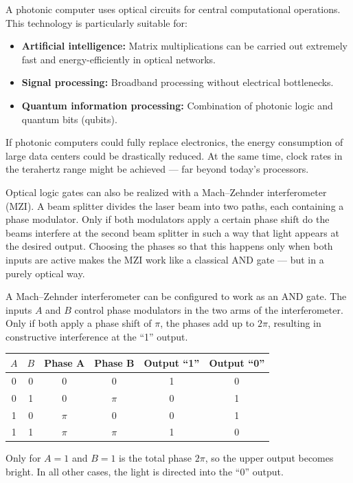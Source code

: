 A photonic computer uses optical circuits for central computational operations. This technology is particularly suitable for:
\begin{itemize}
	\item \textbf{Artificial intelligence:} Matrix multiplications can be carried out extremely fast and energy-efficiently in optical networks.
	\item \textbf{Signal processing:} Broadband processing without electrical bottlenecks.
	\item \textbf{Quantum information processing:} Combination of photonic logic and quantum bits (qubits).
\end{itemize}
\vspace{1em}
\begin{tcolorbox}[hypobox, title={What If Optical Computers Replaced Electronics?}]
	\label{box:optlogik_zukunft}
	\small
	If photonic computers could fully replace electronics, the energy consumption of large data centers could be drastically reduced. At the same time, clock rates in the terahertz range might be achieved — far beyond today’s processors.
\end{tcolorbox}
\vspace{1em}
Optical logic gates can also be realized with a Mach–Zehnder interferometer (MZI). 
A beam splitter divides the laser beam into two paths, each containing a phase modulator. 
Only if both modulators apply a certain phase shift do the beams interfere at the second beam splitter in such a way that light appears at the desired output. 
Choosing the phases so that this happens only when both inputs are active makes the MZI work like a classical \textsc{AND} gate — but in a purely optical way. 
\vspace{1em}
\begin{tcolorbox}[didaktikbox, title=Photonic AND Gate in a Mach--Zehnder Interferometer, label={box:mzi_and}]
	\small
	A Mach--Zehnder interferometer can be configured to work as an \textsc{AND} gate. 
	The inputs \(A\) and \(B\) control phase modulators in the two arms of the interferometer. 
	Only if both apply a phase shift of \(\pi\), the phases add up to \(2\pi\), resulting in constructive interference at the “1” output.
	
\begin{center}
	\begin{tabular}{c c c c c c}
		\hline
		\(A\) & \(B\) & Phase A & Phase B & Output “1” & Output “0” \\
		\hline
		0 & 0 & \(0\) & \(0\) & 1 & 0 \\
		0 & 1 & \(0\) & \(\pi\) & 0 & 1 \\
		1 & 0 & \(\pi\) & \(0\) & 0 & 1 \\
		1 & 1 & \(\pi\) & \(\pi\) & 1 & 0 \\
		\hline
	\end{tabular}
\end{center}

	Only for \(A=1\) and \(B=1\) is the total phase \(2\pi\), so the upper output becomes bright. 
	In all other cases, the light is directed into the “0” output.
\end{tcolorbox}
